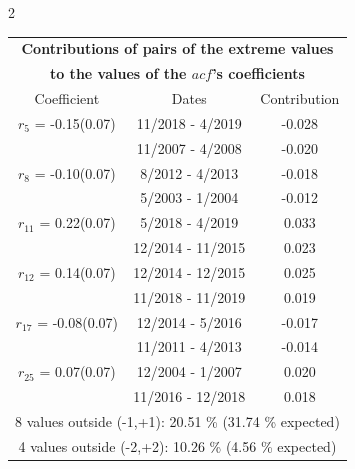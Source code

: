
\thispagestyle{empty}
\begin{multicols}{2}{ 
\begin{tabular}{ccc}
\multicolumn{3}{c}{\textbf{Contributions of pairs of the extreme values} }  \vspace{-.10in}  \\ 
\multicolumn{3}{c}{ \textbf{to the values of the $acf$'s coefficients}} \\ 
\hline 
\hline                  Coefficient  &  Dates &  Contribution \\ 
\hline 
  $r_{ 5}$ = -0.15(0.07) &      11/2018 -  4/2019 &       -0.028    \vspace{-.10in} \\ 
  &       11/2007 -  4/2008 &       -0.020  \vspace{-.02in}   \\ \hline 
    $r_{ 8}$ = -0.10(0.07) &       8/2012 -  4/2013 &       -0.018    \vspace{-.10in} \\ 
  &        5/2003 -  1/2004 &       -0.012  \vspace{-.02in}   \\ \hline 
    $r_{11}$ = 0.22(0.07) &       5/2018 -  4/2019 &        0.033   \vspace{-.10in} \\  
&       12/2014 - 11/2015 &        0.023  \vspace{-.02in} \\ \hline 
  $r_{12}$ = 0.14(0.07) &      12/2014 - 12/2015 &        0.025   \vspace{-.10in} \\  
&       11/2018 - 11/2019 &        0.019  \vspace{-.02in} \\ \hline 
  $r_{17}$ = -0.08(0.07) &      12/2014 -  5/2016 &       -0.017    \vspace{-.10in} \\ 
  &       11/2011 -  4/2013 &       -0.014  \vspace{-.02in}   \\ \hline 
    $r_{25}$ = 0.07(0.07) &      12/2004 -  1/2007 &        0.020   \vspace{-.10in} \\  
&       11/2016 - 12/2018 &        0.018  \vspace{-.02in} \\ \hline 
\multicolumn{3}{c}{               8 values outside (-1,+1): 20.51  \% (31.74  \% expected)}\vspace{-.10in} \\ 
\multicolumn{3}{c}{               4 values outside (-2,+2): 10.26 \%  (4.56 \% expected) } \\
 \end{tabular} \\ 
 } 
\end{multicols} 
